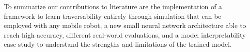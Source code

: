 \documentclass[../document.tex]{subfiles}
\begin{document}
To summarize our contributions to literature are the implementation of a framework to learn traversability entirely through simulation that can be employed with any mobile robot, a new small neural network architecture able to reach high accuracy, different real-world evaluations, and a model interpretability case study to understand the strengths and limitations of the trained model. 
\end{document}
